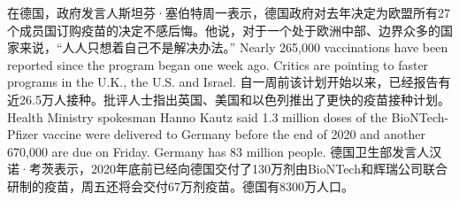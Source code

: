 在德国，政府发言人斯坦芬·塞伯特周一表示，德国政府对去年决定为欧盟所有27个成员国订购疫苗的决定不感后悔。他说，对于一个处于欧洲中部、边界众多的国家来说，“人人只想着自己不是解决办法。”
Nearly 265,000 vaccinations have been reported since the program began one week ago. Critics are pointing to faster programs in the U.K., the U.S. and Israel.
自一周前该计划开始以来，已经报告有近26.5万人接种。批评人士指出英国、美国和以色列推出了更快的疫苗接种计划。
Health Ministry spokesman Hanno Kautz said 1.3 million doses of the BioNTech-Pfizer vaccine were delivered to Germany before the end of 2020 and another 670,000 are due on Friday. Germany has 83 million people.
德国卫生部发言人汉诺·考茨表示，2020年底前已经向德国交付了130万剂由BioNTech和辉瑞公司联合研制的疫苗，周五还将会交付67万剂疫苗。德国有8300万人口。
